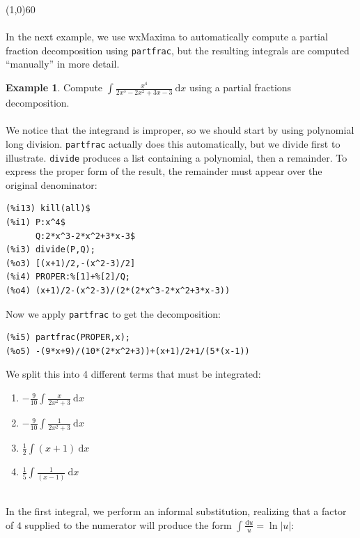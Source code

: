 \documentclass[10.5pt,twoside]{report}
\theoremstyle{definition}
\newtheorem{exmp}{Example}[section]
\begin{document}
\line(1,0){60}
\linethickness{0.5mm}
${}$\\
${}$\\
In the next example, we use wxMaxima to automatically compute a partial fraction decomposition using \verb|partfrac|, but the resulting integrals are computed ``manually'' in more detail.\\



\begin{exmp} Compute $\displaystyle \int \frac{x^4}{2x^3-2x^2+3x-3}\ \mathrm{d}x$ using a partial fractions decomposition.\\

${}$\\

We notice that the integrand is improper, so we should start by using polynomial long division.  \verb|partfrac| actually does this automatically, but we divide first to illustrate.  \verb|divide| produces a list containing a polynomial, then a remainder.  To express the proper form of the result, the remainder must appear over the original denominator:

\begin{verbatim}
(%i13) kill(all)$
(%i1) P:x^4$
      Q:2*x^3-2*x^2+3*x-3$
(%i3) divide(P,Q);
(%o3) [(x+1)/2,-(x^2-3)/2]
(%i4) PROPER:%[1]+%[2]/Q;
(%o4) (x+1)/2-(x^2-3)/(2*(2*x^3-2*x^2+3*x-3))
\end{verbatim}

Now we apply \verb|partfrac| to get the decomposition:

\begin{verbatim}
(%i5) partfrac(PROPER,x);
(%o5) -(9*x+9)/(10*(2*x^2+3))+(x+1)/2+1/(5*(x-1))
\end{verbatim}

We split this into 4 different terms that must be integrated:\\
\begin{enumerate}
\item $-\frac{9}{10}\displaystyle \int \frac{x}{2x^2+3}\ \mathrm{d}x$
\item $-\frac{9}{10}\displaystyle \int \frac{1}{2x^2+3}\ \mathrm{d}x$
\item $\frac{1}{2}\displaystyle \int (x+1)\ \mathrm{d}x$
\item $\frac{1}{5}\displaystyle \int \frac{1}{(x-1)}\ \mathrm{d}x$
\end{enumerate}
${}$\\
In the first integral, we perform an informal substitution, realizing that a factor of $4$ supplied to the numerator will produce the form $\displaystyle \int \frac{\mathrm{d}u}{u}=\ln{|u|}$: \\


\end{exmp}
\end{document}
